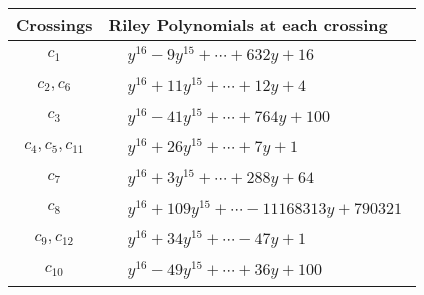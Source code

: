 \documentclass[1p]{elsarticle_modified}
\theoremstyle{definition}
\begin{document}
\begin{tabular}{m{50pt}|m{274pt}}
Crossings & \hspace{64pt}Riley Polynomials at each crossing \\
\hline $$\begin{aligned}c_{1}\end{aligned}$$&$\begin{aligned}
&y^{16}-9 y^{15}+\cdots+632 y+16
\end{aligned}$\\
\hline $$\begin{aligned}c_{2},c_{6}\end{aligned}$$&$\begin{aligned}
&y^{16}+11 y^{15}+\cdots+12 y+4
\end{aligned}$\\
\hline $$\begin{aligned}c_{3}\end{aligned}$$&$\begin{aligned}
&y^{16}-41 y^{15}+\cdots+764 y+100
\end{aligned}$\\
\hline $$\begin{aligned}c_{4},c_{5},c_{11}\end{aligned}$$&$\begin{aligned}
&y^{16}+26 y^{15}+\cdots+7 y+1
\end{aligned}$\\
\hline $$\begin{aligned}c_{7}\end{aligned}$$&$\begin{aligned}
&y^{16}+3 y^{15}+\cdots+288 y+64
\end{aligned}$\\
\hline $$\begin{aligned}c_{8}\end{aligned}$$&$\begin{aligned}
&y^{16}+109 y^{15}+\cdots-11168313 y+790321
\end{aligned}$\\
\hline $$\begin{aligned}c_{9},c_{12}\end{aligned}$$&$\begin{aligned}
&y^{16}+34 y^{15}+\cdots-47 y+1
\end{aligned}$\\
\hline $$\begin{aligned}c_{10}\end{aligned}$$&$\begin{aligned}
&y^{16}-49 y^{15}+\cdots+36 y+100
\end{aligned}$\\
\hline
\end{tabular}\\~\\
\end{document}

